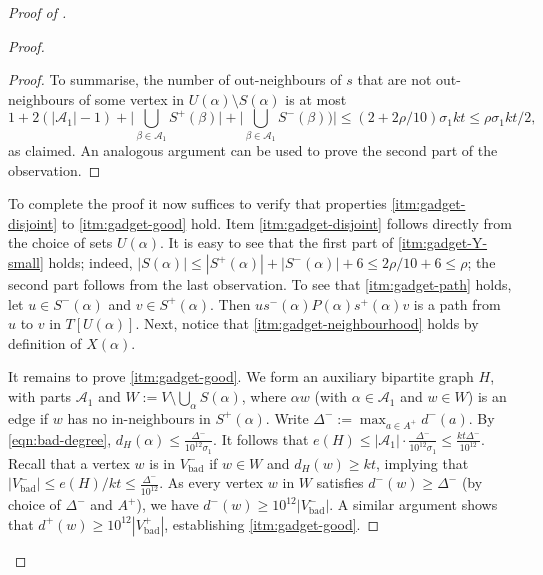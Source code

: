 \documentclass[english]{article}
\theoremstyle{plain}
\theoremstyle{remark}
\def \Sp {S^+}
\def \Sm {S^-}
\def \sp {s^+}
\def \smm {s^-}
\def \Ap {A^+}
\def \dpp {d^+}
\def \dm {d^-}
\def \Vbp {V_{\bad}^+}
\def \Vbm {V_{\bad}^-}
\def \Dm {\Delta^-}
\newcommand{\A}{\mathcal{A}}
\DeclareMathOperator{\bad}{bad}
\begin{document}
\begin{proof}[Proof of ]
\begin{proof}
\begin{proof}
				To summarise, the number of out-neighbours of $s$ that are not out-neighbours of some vertex in $U(\alpha) \setminus S(\alpha)$ is at most
				\begin{equation*}
					1 + 2(|\A_1| - 1) + \Big|\bigcup_{\beta \in \A_1} \Sp(\beta)\Big| + \Big|\bigcup_{\beta \in \A_1} \Sm(\beta))\Big| \le (2 + 2\rho / 10)\sigma_1 kt
					\le \rho \sigma_1 kt/2,
				\end{equation*}
				as claimed. An analogous argument can be used to prove the second part of the observation. 
			\end{proof}

			To complete the proof it now suffices to verify that properties \ref{itm:gadget-disjoint} to \ref{itm:gadget-good} hold. Item \ref{itm:gadget-disjoint} follows directly from the choice of sets $U(\alpha)$. It is easy to see that the first part of \ref{itm:gadget-Y-small} holds; indeed, $|S(\alpha)| \le |\Sp(\alpha)| + |\Sm(\alpha)| + 6 \le 2\rho / 10 + 6 \le \rho$; the second part follows from the last observation.
			To see that \ref{itm:gadget-path} holds, let $u \in \Sm(\alpha)$ and $v \in \Sp(\alpha)$. Then $u \smm(\alpha) P(\alpha) \sp(\alpha) v$ is a path from $u$ to $v$ in $T[U(\alpha)]$. 
			Next, notice that \ref{itm:gadget-neighbourhood} holds by definition of $X(\alpha)$.

			It remains to prove \ref{itm:gadget-good}. We form an auxiliary bipartite graph $H$, with parts $\A_1$ and $W := V \setminus \bigcup_{\alpha} S(\alpha)$, where $\alpha w$ (with $\alpha \in \A_1$ and $w \in W$) is an edge if $w$ has no in-neighbours in $\Sp(\alpha)$. Write $\Dm := \max_{a \in \Ap} \dm(a)$.
			By \eqref{eqn:bad-degree}, $d_H(\alpha) \le \frac{\Dm}{10^{12}\sigma_1}$.
			It follows that $e(H) \le |\A_1| \cdot \frac{\Dm}{10^{12}\sigma_1} \le \frac{kt\Dm}{10^{12}}$. Recall that a vertex $w$ is in $\Vbm$ if $w \in W$ and $d_H(w) \ge kt$, implying that $|\Vbm| \le e(H) / kt \le \frac{\Dm}{10^{12}}$. As every vertex $w$ in $W$ satisfies $\dm(w) \ge \Dm$ (by choice of $\Dm$ and $\Ap$), we have $\dm(w) \ge 10^{12}|\Vbm|$. A similar argument shows that $\dpp(w) \ge 10^{12}|\Vbp|$, establishing \ref{itm:gadget-good}.
		\end{proof}


\end{proof}
\end{document}

